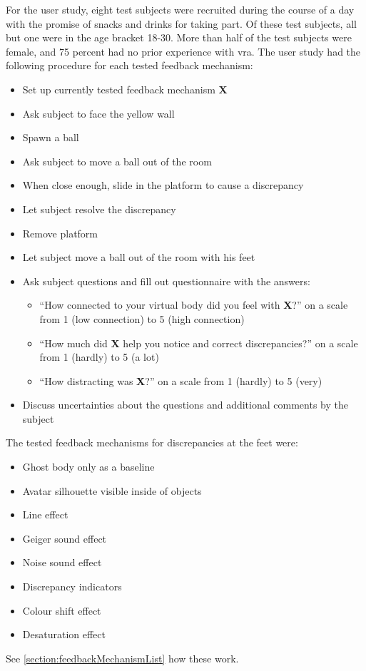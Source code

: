 For the user study, eight test subjects were recruited during the course of a day with the promise of snacks and drinks for taking part. Of these test subjects, all but one were in the age bracket 18-30. More than half of the test subjects were female, and 75 percent had no prior experience with \gls{vra}.
\newline
The user study had the following procedure for each tested feedback mechanism:
\begin{itemize}        
    \item Set up currently tested feedback mechanism \textbf{X}
    \item Ask subject to face the yellow wall
    \item Spawn a ball
    \item Ask subject to move a ball out of the room
    \item When close enough, slide in the platform to cause a discrepancy
    \item Let subject resolve the discrepancy
    \item Remove platform
    \item Let subject move a ball out of the room with his feet
    \item Ask subject questions and fill out questionnaire with the answers:
    \begin{itemize}
        \item \enquote{How connected to your virtual body did you feel with \textbf{X}?} on a scale from 1 (low connection) to 5 (high connection)
        \item \enquote{How much did \textbf{X} help you notice and correct discrepancies?} on a scale from 1 (hardly) to 5 (a lot)
        \item \enquote{How distracting was \textbf{X}?} on a scale from 1 (hardly) to 5 (very)
    \end{itemize}
    \item Discuss uncertainties about the questions and additional comments by the subject
\end{itemize}
The tested feedback mechanisms for discrepancies at the feet were:
\begin{itemize}
    \item Ghost body only as a baseline
    \item Avatar silhouette visible inside of objects
    \item Line effect
    \item Geiger sound effect
    \item Noise sound effect
    \item Discrepancy indicators
    \item Colour shift effect
    \item Desaturation effect
\end{itemize}
See \autoref{section:feedbackMechanismList} how these work.


